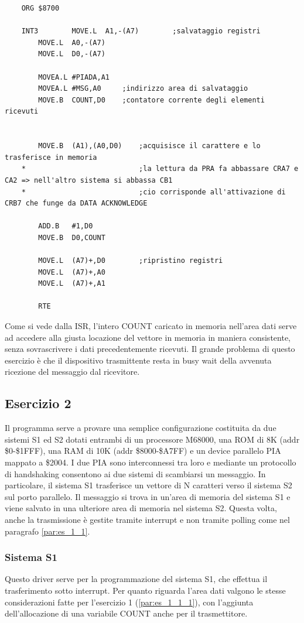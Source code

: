 \begin{lstlisting}
    ORG $8700		

    INT3    	MOVE.L  A1,-(A7)		;salvataggio registri
        MOVE.L  A0,-(A7)
        MOVE.L  D0,-(A7)
    
        MOVEA.L	#PIADA,A1
        MOVEA.L	#MSG,A0	    ;indirizzo area di salvataggio
        MOVE.B	COUNT,D0	;contatore corrente degli elementi ricevuti
    
        
        MOVE.B 	(A1),(A0,D0)	;acquisisce il carattere e lo trasferisce in memoria
    *						    ;la lettura da PRA fa abbassare CRA7 e CA2 => nell'altro sistema si abbassa CB1
    *						    ;cio corrisponde all'attivazione di CRB7 che funge da DATA ACKNOWLEDGE
        
        ADD.B	#1,D0
        MOVE.B	D0,COUNT
    
        MOVE.L  (A7)+,D0		;ripristino registri 
        MOVE.L  (A7)+,A0
        MOVE.L  (A7)+,A1
        
        RTE
\end{lstlisting}

Come si vede dalla ISR, l'intero COUNT caricato in memoria nell'area dati serve ad accedere alla giusta locazione del vettore in memoria in maniera consistente, senza sovrascrivere i dati precedentemente ricevuti. 
Il grande problema di questo esercizio è che il dispositivo trasmittente resta in busy wait della avvenuta ricezione del messaggio dal ricevitore. 

\subsection{Esercizio 2}\label{par:es_1_2}
Il programma serve a provare una semplice configurazione costituita da due sistemi S1 ed S2 dotati entrambi di un processore M68000, una ROM di 8K (addr \$0-\$1FFF), una RAM di 10K (addr \$8000-\$A7FF) e un device parallelo PIA mappato a \$2004. I due PIA sono interconnessi tra loro e mediante un protocollo di handshaking consentono ai due sistemi di scambiarsi un messaggio. In particolare, il sistema S1 trasferisce un vettore di N caratteri verso il sistema S2 sul porto parallelo. Il messaggio si trova in un'area di memoria del sistema S1 e viene salvato in una ulteriore area di memoria nel sistema S2. Questa volta, anche la trasmissione è gestite tramite interrupt e non tramite polling come nel paragrafo \ref{par:es_1_1}.

\subsubsection{Sistema S1}
Questo driver serve per la programmazione del sistema S1, che effettua il trasferimento sotto interrupt.
Per quanto riguarda l'area dati valgono le stesse considerazioni fatte per l'esercizio 1 (\ref{par:es_1_1_1}), con l'aggiunta dell'allocazione di una variabile COUNT anche per il trasmettitore. 

